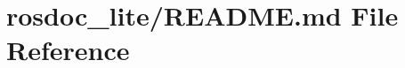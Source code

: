 \hypertarget{rosdoc__lite_2README_8md}{}\section{rosdoc\+\_\+lite/\+R\+E\+A\+D\+ME.md File Reference}
\label{rosdoc__lite_2README_8md}
